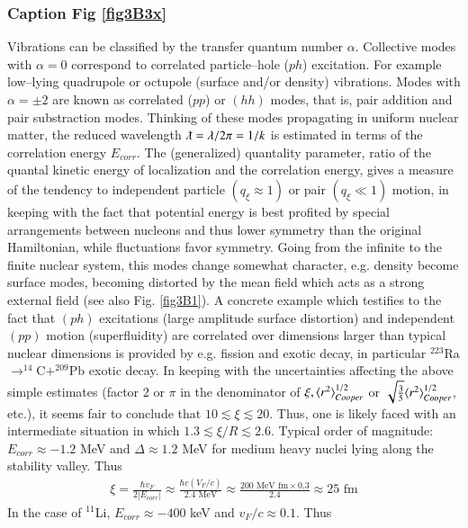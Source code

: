 \begin{subappendices}
         \subsubsection{Caption Fig \ref{fig3B3x}}
         Vibrations can be classified by the transfer quantum number $\alpha$. Collective modes with $\alpha=0$ correspond to correlated particle--hole ($ph$) excitation. For example low--lying quadrupole or octupole (surface and/or density) vibrations. Modes with $\alpha=\pm2$ are known as correlated ($pp$) or $(hh)$ modes, that is, pair addition and pair substraction modes.
         Thinking of these modes propagating in uniform nuclear matter, the reduced wavelength $\lambdabar=\lambda/2\pi=1/k$ is estimated in terms of the correlation energy $E_{corr}$. The (generalized) quantality parameter, ratio of the quantal kinetic energy of localization and the correlation energy,  gives a measure of the tendency to independent particle $(q_\xi\approx1)$ or pair $(q_\xi\ll1)$ motion, in keeping with the fact that potential energy is best profited by special arrangements between nucleons and thus lower symmetry than the original Hamiltonian, while fluctuations favor symmetry. Going from the infinite to the finite nuclear system, this modes change somewhat character, e.g. density become surface modes, becoming distorted by the mean field which acts as a strong external field (see also Fig. \ref{fig3B1}). A concrete example which testifies to the fact that $(ph)$ excitations (large amplitude surface distortion) and independent $(pp)$ motion (superfluidity) are correlated over dimensions larger than typical nuclear dimensions is provided by e.g. fission and exotic decay, in particular $^{223}$Ra$\rightarrow^{14}$C$+^{209}$Pb exotic decay. In keeping with the uncertainties affecting the above simple estimates (factor 2 or $\pi$ in the denominator of $\xi,\langle {r^2} \rangle^{1/2}_{Cooper}$ or $\sqrt{\frac{3}{5}}\langle {r^2} \rangle^{1/2}_{Cooper}$, etc.), it seems fair to conclude that $10\lesssim\xi\lesssim20$. Thus, one is likely faced with an intermediate situation in which $1.3\lesssim\xi/R\lesssim2.6.$
         \newpage
 Typical order of magnitude: $E_{corr}\approx -1.2 $ MeV and $\Delta\approx 1.2$ MeV for medium heavy nuclei lying along the stability valley. Thus
 \begin{align}
 \xi=\frac{\hbar v_F}{2|E_{corr}|}\approx\frac{\hbar c(V_F/c)}{2.4\text{ MeV}}\approx\frac{200\text{ MeV fm}\times 0.3}{2.4}\approx 25\text{ fm}
 \end{align} 
 In the case of $^{11}$Li, $E_{corr}\approx-400$ keV and $v_F/c\approx 0.1$. Thus

\end{subappendices}
